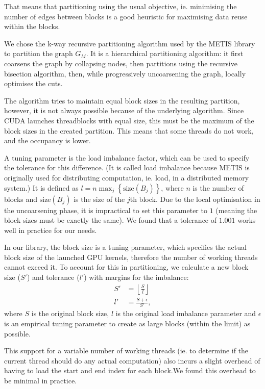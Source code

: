 That means that partitioning using the usual objective, ie. minimising the
number of edges between blocks is a good heuristic for maximising data reuse
within the blocks.

We chose the k-way recursive partitioning algorithm used by the
METIS\cite{metis} library to partition the graph $G_M$. It is a hierarchical
partitioning algorithm: it first coarsens the graph by collapsing nodes, then
partitions using the recursive bisection algorithm, then, while progressively
uncoarsening the graph, locally optimises the cuts.

The algorithm tries to maintain equal block sizes in the resulting partition,
however, it is not always possible because of the underlying algorithm. Since CUDA
launches threadblocks with equal size, this must be the maximum of the block
sizes in the created partition. This means that some threads do not work, and
the occupancy is lower.

A tuning parameter is the load imbalance factor, which can be used to specify
the tolerance for this difference. (It is called load imbalance because METIS is
originally used for distributing computation, ie. load, in a distributed memory
system.) It is defined as $l = n\max_j \left\{\mathrm{size}(B_j) \right\}$,
where $n$ is the number of blocks and $\mathrm{size}(B_j)$ is the size of the
$j$th block. Due to the local optimisation in the uncoarsening phase, it is
impractical to set this parameter to $1$ (meaning the block sizes must be
exactly the same). We found that a tolerance of $1.001$ works well in practice
for our needs.

In our library, the block size is a tuning parameter, which specifies the actual
block size of the launched GPU kernels, therefore the number of working threads
cannot exceed it. To account for this in partitioning, we calculate a new block
size ($S'$) and tolerance ($l'$) with margins for the imbalance:
\begin{align}
  S' &= \left\lfloor \frac{S}{l} \right\rfloor \\
  l' &= \frac{S + \epsilon}{S'},
\end{align}
where $S$ is the original block size, $l$ is the original load imbalance
parameter and $\epsilon$ is an empirical tuning parameter to create as large
blocks (within the limit) as possible.

This support for a variable number of working threads (ie. to determine if the
current thread should do any actual computation) also incurs a slight overhead of having to load the start and end index for each block.We found this overhead to be
minimal in practice.

